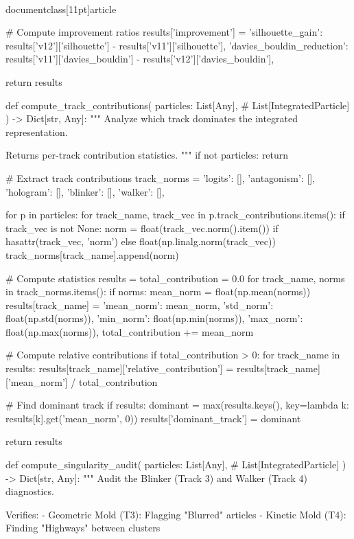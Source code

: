 \\documentclass[11pt]{article}
\begin{document}
\begin{CodeBlock}
        # Compute improvement ratios
        results['improvement'] = {
            'silhouette_gain': results['v12']['silhouette'] - results['v11']['silhouette'],
            'davies_bouldin_reduction': results['v11']['davies_bouldin'] - results['v12']['davies_bouldin'],
        }

    return results


def compute_track_contributions(
    particles: List[Any],  # List[IntegratedParticle]
) -> Dict[str, Any]:
    """
    Analyze which track dominates the integrated representation.

    Returns per-track contribution statistics.
    """
    if not particles:
        return {}

    # Extract track contributions
    track_norms = {
        'logits': [],
        'antagonism': [],
        'hologram': [],
        'blinker': [],
        'walker': [],
    }

    for p in particles:
        for track_name, track_vec in p.track_contributions.items():
            if track_vec is not None:
                norm = float(track_vec.norm().item()) if hasattr(track_vec, 'norm') else float(np.linalg.norm(track_vec))
                track_norms[track_name].append(norm)

    # Compute statistics
    results = {}
    total_contribution = 0.0
    for track_name, norms in track_norms.items():
        if norms:
            mean_norm = float(np.mean(norms))
            results[track_name] = {
                'mean_norm': mean_norm,
                'std_norm': float(np.std(norms)),
                'min_norm': float(np.min(norms)),
                'max_norm': float(np.max(norms)),
            }
            total_contribution += mean_norm

    # Compute relative contributions
    if total_contribution > 0:
        for track_name in results:
            results[track_name]['relative_contribution'] = results[track_name]['mean_norm'] / total_contribution

    # Find dominant track
    if results:
        dominant = max(results.keys(), key=lambda k: results[k].get('mean_norm', 0))
        results['dominant_track'] = dominant

    return results


def compute_singularity_audit(
    particles: List[Any],  # List[IntegratedParticle]
) -> Dict[str, Any]:
    """
    Audit the Blinker (Track 3) and Walker (Track 4) diagnostics.

    Verifies:
    - Geometric Mold (T3): Flagging "Blurred" articles
    - Kinetic Mold (T4): Finding "Highways" between clusters


\end{CodeBlock}
\end{document}
